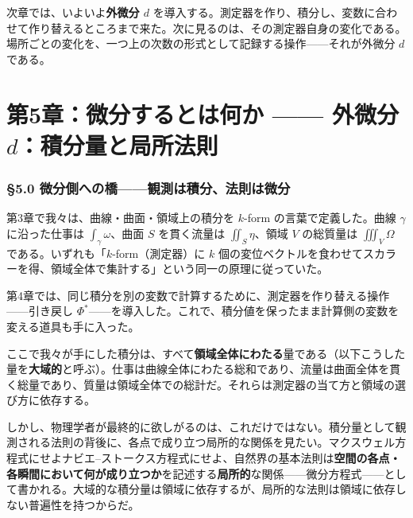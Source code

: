 \documentclass[a4paper,12pt,openany]{book}
\begin{document}
\par\vspace{0.35em}\par

次章では、いよいよ\textbf{外微分 $d$}
を導入する。測定器を作り、積分し、変数に合わせて作り替えるところまで来た。次に見るのは、その測定器自身の変化である。場所ごとの変化を、一つ上の次数の形式として記録する操作——それが外微分
\(d\) である。

\newpage

\hypertarget{ux7b2c5ux7ae0ux5faeux5206ux3059ux308bux3068ux306fux4f55ux304b-ux5916ux5faeux5206-dux7a4dux5206ux91cfux3068ux5c40ux6240ux6cd5ux5247}{%
\chapter{\texorpdfstring{第5章：微分するとは何か —— 外微分
\(d\)：積分量と局所法則}{第5章：微分するとは何か —— 外微分 d：積分量と局所法則}}\label{ux7b2c5ux7ae0ux5faeux5206ux3059ux308bux3068ux306fux4f55ux304b-ux5916ux5faeux5206-dux7a4dux5206ux91cfux3068ux5c40ux6240ux6cd5ux5247}}

\hypertarget{ux5faeux5206ux5074ux3078ux306eux6a4bux89b3ux6e2cux306fux7a4dux5206ux6cd5ux5247ux306fux5faeux5206}{%
\subsection{§5.0
微分側への橋——観測は積分、法則は微分}\label{ux5faeux5206ux5074ux3078ux306eux6a4bux89b3ux6e2cux306fux7a4dux5206ux6cd5ux5247ux306fux5faeux5206}}

第3章で我々は、曲線・曲面・領域上の積分を \(k\)-form
の言葉で定義した。曲線 \(\gamma\) に沿った仕事は
\(\int_\gamma \omega\)、曲面 \(S\) を貫く流量は \(\iint_S \eta\)、領域
\(V\) の総質量は \(\iiint_V \Omega\)
である。いずれも「\(k\)-form（測定器）に \(k\)
個の変位ベクトルを食わせてスカラーを得、領域全体で集計する」という同一の原理に従っていた。

第4章では、同じ積分を別の変数で計算するために、測定器を作り替える操作——引き戻し
\(\Phi^*\)——を導入した。これで、積分値を保ったまま計算側の変数を変える道具も手に入った。

ここで我々が手にした積分は、すべて\textbf{領域全体にわたる}量である（以下こうした量を\textbf{大域的}と呼ぶ）。仕事は曲線全体にわたる総和であり、流量は曲面全体を貫く総量であり、質量は領域全体での総計だ。それらは測定器の当て方と領域の選び方に依存する。

しかし、物理学者が最終的に欲しがるのは、これだけではない。積分量として観測される法則の背後に、各点で成り立つ局所的な関係を見たい。マクスウェル方程式にせよナビエ–ストークス方程式にせよ、自然界の基本法則は\textbf{空間の各点・各瞬間において何が成り立つか}を記述する\textbf{局所的}な関係——微分方程式——として書かれる。大域的な積分量は領域に依存するが、局所的な法則は領域に依存しない普遍性を持つからだ。
\end{document}
